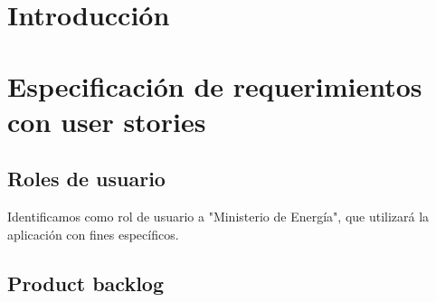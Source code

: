 \documentclass[a4paper]{article}
\begin{document}
\thispagestyle{empty}

\maketitle
\newpage

\thispagestyle{empty}
\vfill

\thispagestyle{empty}
\vspace{1.5cm}
\tableofcontents
\newpage


\newpage
\section{Introducción}
\setcounter{page}{1}
%


\section{Especificación de requerimientos con user stories}
\subsection{Roles de usuario}
Identificamos como rol de usuario a "Ministerio de Energía", que utilizará la aplicación con fines específicos.
\subsection{Product backlog}
\end{document}
